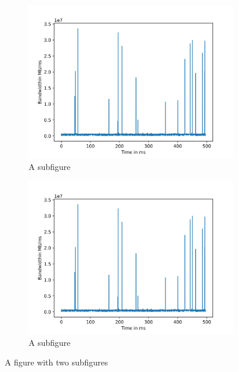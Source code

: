 \documentclass{article}
\begin{document}
\begin{figure}
    \centering
    \begin{subfigure}{.5\textwidth}
      \centering
      \includegraphics[width=1.3\linewidth]{./Code/nm_mytest_bw.jpg}
      \caption{A subfigure}
      \label{fig:sub1}
    \end{subfigure}%
    \begin{subfigure}{.5\textwidth}
      \centering
      \includegraphics[width=1.3\linewidth]{./Code/nm_mytest_bw.jpg}
      \caption{A subfigure}
      \label{fig:sub2}
    \end{subfigure}
    \caption{A figure with two subfigures}
    \label{fig:test}
\end{figure}
\newpage
\end{document}
